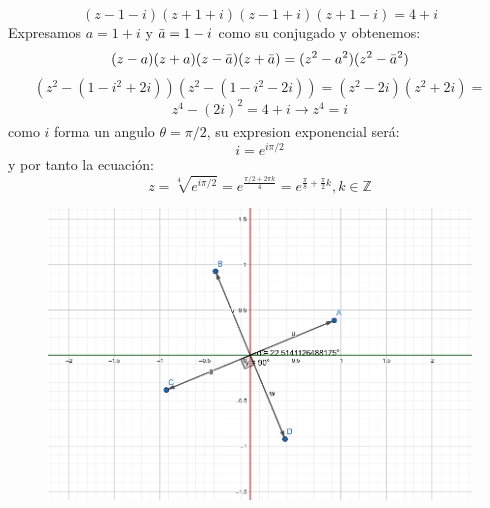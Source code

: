 \documentclass[12pt,a4paper,oneside,onecolumn]{article}
\begin{document}
 
    \section{}
    \[
        (z -1 -i)(z +1 +i)(z -1 +i)(z +1 -i) = 4 + i
    \]
    \newline Expresamos $a = 1 + i$ y $\Bar{a} = 1-i$ como su conjugado y obtenemos:
    \[
        (z - a)(z + a)(z - \Bar{a})(z +\Bar{a}) = (z^2 - a^2)(z^2-\Bar{a}^2)
    \]
    \[
         (z^2-(1-i^2+2i))(z^2 - (1-i^2-2i))
        = (z^2 - 2i)(z^2 + 2i) =
    \]
    \[
        z^4 - (2i)^2 = 4 + i \xrightarrow[]{} z^4 = i
    \]
    como $i$ forma un angulo $\theta = \pi/2$, su expresion exponencial ser\'a:
    \[
        i = e^{i\pi/2}
    \]
    y por tanto la ecuaci\'on:
    \[
        z = \sqrt[4]{e^{i\pi/2}} = e^{\frac{\pi/2 + 2\pi k}{4}} = e^{\frac{\pi}{8} + \frac{\pi}{2}k}, k \in \mathbb{Z}
    \]
    \begin{figure}[!h]
		\centering
		\includegraphics[scale=0.55]{ex1.png}
		\caption{}
		\label{fig:1}
	\end{figure}
    \newline \newline 
\end{document}
